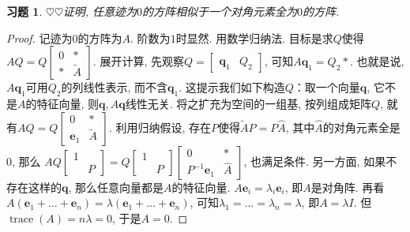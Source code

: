 \documentclass{ctexart}
\newtheorem{exercise}[thm]{习题}
\newcommand\bs[1]{\boldsymbol{ #1}}
\newcommand\hint[1]{\par {\footnotesize\kaishu 提示：#1}}
\def\hard{$\heartsuit$}
\def\wtd{\widetilde}
\def\what{\widehat}
\DeclareMathOperator{\trace}{trace}
\begin{document}
\begin{exercise}
\hard\hard 证明, 任意迹为$0$的方阵相似于一个对角元素全为$0$的方阵. 

\end{exercise}
\begin{proof}
	记迹为$0$的方阵为$A$. 
	阶数为$1$时显然. 用数学归纳法. 目标是求$Q$使得$AQ=Q\begin{bmatrix}
		0 & *\\ * & \wtd A
	\end{bmatrix}$. 
	展开计算, 先观察$Q=\begin{bmatrix}
		\bs q_1 & Q_2
	\end{bmatrix}$, 可知$A\bs q_1=Q_2*$. 也就是说, $A\bs q_1$可用$Q_2$的列线性表示, 而不含$\bs q_1$. 
	这提示我们如下构造$Q$：取一个向量$\bs q$, 它不是$A$的特征向量, 则$\bs q,A\bs q$线性无关. 将之扩充为空间的一组基, 按列组成矩阵$Q$, 就有$AQ=Q\begin{bmatrix}
		0 &*\\ \bs e_1 & \wtd A
	\end{bmatrix}$. 
	利用归纳假设, 存在$P$使得$\wtd AP=P\what A$, 其中$\what A$的对角元素全是$0$, 那么
	$AQ\begin{bmatrix}
		1 & \\ & P
	\end{bmatrix}=Q\begin{bmatrix}
	1 & \\ & P
	\end{bmatrix}\begin{bmatrix}
	0 & *\\ P^{-1}\bs e_1 &\what A
	\end{bmatrix}$, 也满足条件. 
	另一方面, 如果不存在这样的$\bs q$, 那么任意向量都是$A$的特征向量. 
	$A\bs e_i=\lambda_i\bs e_i$, 即$A$是对角阵. 
	再看$A(\bs e_1+\dots+\bs e_n)=\lambda(\bs e_1+\dots+\bs e_n)$, 可知$\lambda_1=\dots=\lambda_n=\lambda$, 即$A=\lambda I$. 
	但$\trace(A)=n\lambda=0$, 于是$A=0$. 
\end{proof}
\end{document}
